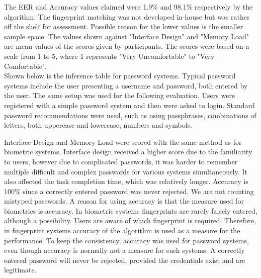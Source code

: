 The EER and Accuracy values claimed were 1.9\% and 98.1\% respectively by the algorithm. The fingerprint matching was not developed in-house but was rather off the shelf for assessment. Possible reason for the lower values is the smaller sample space. The values shown against "Interface Design" and "Memory Load" are mean values of the scores given by participants. The scores were based on a scale from 1 to 5, where 1 represents "Very Uncomfortable" to "Very Comfortable".\\
Shown below is the inference table for password systems. Typical password systems include the user presenting a username and password, both entered by the user. The same setup was used for the following evaluation. Users were registered with a simple password system and then were asked to login. Standard password recommendations were used, such as using passphrases, combinations of letters, both uppercase and lowercase, numbers and symbols. 

\begin{center}
\begin{table}[H]
\caption{Results for password based systems.}
\label{tab:result2}
\end{table}
\end{center}

Interface Design and Memory Load were scored with the same method as for biometric systems. Interface design received a higher score due to the familiarity to users, however due to complicated passwords, it was harder to remember multiple difficult and complex passwords for various systems simultaneously. It also affected the task completion time, which was relatively longer. Accuracy is 100\% since a correctly entered password was never rejected. We are not counting mistyped passwords. A reason for using accuracy is that the measure used for biometrics is accuracy. In biometric systems fingerprints are rarely falsely entered, although a possibility. Users are aware of which fingerprint is required. Therefore, in fingerprint systems accuracy of the algorithm is used as a measure for the performance. To keep the consistency, accuracy was used for password systems, even though accuracy is normally not a measure for such systems. A correctly entered password will never be rejected, provided the credentials exist and are legitimate.

